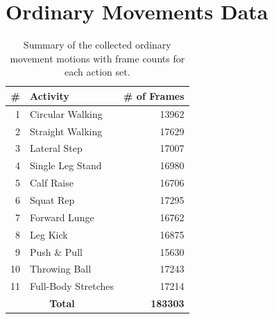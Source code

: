 \section{Ordinary Movements Data}
\begin{table}[h!]
\small
\centering
\begin{tabular}{r|l|r}
\hline
\textbf{\#} & \textbf{Activity} & \textbf{\# of Frames} \\
\hline
1 & Circular Walking & 13962 \\
2 & Straight Walking & 17629 \\
3 & Lateral Step & 17007 \\
4 & Single Leg Stand & 16980 \\
5 & Calf Raise & 16706 \\
6 & Squat Rep & 17295 \\
7 & Forward Lunge & 16762 \\
8 & Leg Kick & 16875 \\
9 & Push \& Pull & 15630 \\
10 & Throwing Ball & 17243 \\
11 & Full-Body Stretches & 17214 \\
\hline
\multicolumn{2}{c|}{\textbf{Total}} & \textbf{183303} \\
\hline
\end{tabular}
\vspace{0.3cm}
\caption{Summary of the collected ordinary movement motions with frame counts for each action set.}
\label{{tab:om_summary}}
\end{table}
